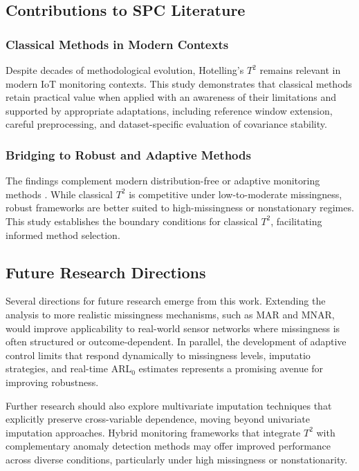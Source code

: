 \subsection{Contributions to SPC Literature}

\subsubsection{Classical Methods in Modern Contexts}

Despite decades of methodological evolution, Hotelling’s $T^2$ remains relevant in modern IoT monitoring contexts. This study demonstrates that classical methods retain practical value when applied with an awareness of their limitations and supported by appropriate adaptations, including reference window extension, careful preprocessing, and dataset-specific evaluation of covariance stability.

\subsubsection{Bridging to Robust and Adaptive Methods}

The findings complement modern distribution-free or adaptive monitoring methods \cite{Xie2023,Xie2024}. While classical $T^2$ is competitive under low-to-moderate missingness, robust frameworks are better suited to high-missingness or nonstationary regimes. This study establishes the boundary conditions for classical $T^2$, facilitating informed method selection.

\subsection{Future Research Directions}

Several directions for future research emerge from this work. Extending the analysis to more realistic missingness mechanisms, such as \ac{MAR} and \ac{MNAR}, would improve applicability to real-world sensor networks where missingness is often structured or outcome-dependent. In parallel, the development of adaptive control limits that respond dynamically to missingness levels, imputatio strategies, and real-time \ac{ARL}$_0$ estimates represents a promising avenue for improving robustness.

Further research should also explore multivariate imputation techniques that explicitly preserve cross-variable dependence, moving beyond univariate imputation approaches. Hybrid monitoring frameworks that integrate $T^2$ with complementary anomaly detection methods may offer improved performance across diverse conditions, particularly under high missingness or nonstationarity.

